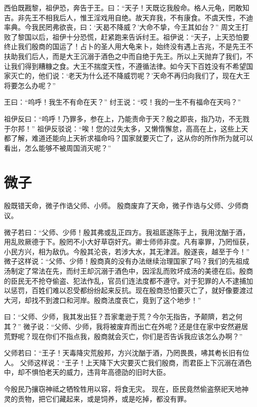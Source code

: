 \documentclass[a4paper,12pt,UTF8,twoside]{ctexbook}
\begin{document}
西伯既戡黎，祖伊恐，奔告于王。曰：“天子！天既讫我殷命。格人元龟，罔敢知吉。非先王不相我后人，惟王淫戏用自绝。故天弃我，不有康食。不虞天性，不迪率典。今我民罔弗欲丧，曰：‘天曷不降威？’大命不挚，今王其如台？”
周文王打败了黎国以后，祖伊十分恐慌，赶紧跑来告诉纣王。祖伊说：“天子，上天恐怕要终止我们殷商的国运了！占卜的圣人用大龟来卜，始终没有遇上吉兆，不是先王不扶助我们后人，而是大王沉溺于酒色之中而自绝于先王。所以上天抛弃了我们，不让我们得到糟糠之食。大王不揣度天性，不遵循法律。如今天下百姓没有不希望国家灭亡的，他们说：‘老天为什么还不降威罚呢？’天命不再归向我们了，现在大王将要怎么办呢？”

王曰：“呜呼！我生不有命在天？”
纣王说：“哎！我的一生不有福命在天吗？”

祖伊反曰：“呜呼！乃罪多，参在上，乃能责命于天？殷之即丧，指乃功，不无戮于尔邦！”
祖伊反驳说：“唉！您的过失太多，又懒惰懈怠，高高在上，这些上天都了解，难道还能向上天祈求福命吗？国家就要灭亡了，这从你的所作所为就可以看出，怎么能够不被周国消灭呢？”

\chapter{微子}

殷既错天命，微子作诰父师、小师。
殷商废弃了天命，微子作诰与父师、少师商议。

微子若曰：“父师、少师！殷其弗或乱正四方。我祖厎遂陈于上，我用沈酗于酒，用乱败厥德于下。殷罔不小大好草窃奸宄。卿士师师非度。凡有辜罪，乃罔恒获，小民方兴，相为敌仇。今殷其沦丧，若涉大水，其无津涯。殷遂丧，越至于今！”
微子这样说：“父师、少师！殷商真的没有办法继续治理国家了吗？我们的先祖成汤制定了常法在先，而纣王却沉溺于酒色中，因淫乱而败坏成汤的美德在后。殷商的臣民无不抢夺偷盗、犯法作乱，官员们连法度都不遵守。对于犯罪的人不逮捕加以惩罚，百姓们难以忍受都纷纷起来反抗。现在殷商恐怕要灭亡了，就好像要渡过大河，却找不到渡口和河岸。殷商法度丧亡，竟到了这个地步！”

曰：“父师、少师，我其发出狂？吾家耄逊于荒？今尔无指告，予颠隮，若之何其？”
微子说：“父师、少师，我将被废弃而出亡在外呢？还是住在家中安然避居荒野呢？现在你们不指点我，殷商就会灭亡，你们是否告诉我应该怎么办啊？”

父师若曰：“王子！天毒降灾荒殷邦，方兴沈酗于酒，乃罔畏畏，咈其耇长旧有位人。
父师这样说：“王子！上天降下大灾要灭亡我们殷商，而君臣上下沉溺在酒色中，却不惧怕老天的威力，违背年高德劭的旧时大臣。

今殷民乃攘窃神祗之牺牷牲用以容，将食无灾。
现在，臣民竟然偷盗祭祀天地神灵的贡物，把它们藏起来，或是饲养，或是吃掉，都没有罪。
\end{document}
